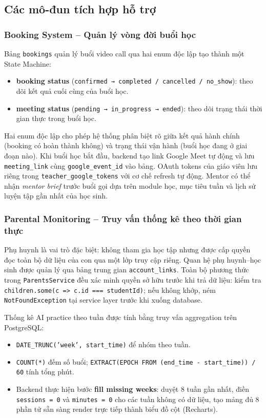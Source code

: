 \subsection{Các mô-đun tích hợp hỗ trợ}

\subsubsection{Booking System -- Quản lý vòng đời buổi học}

Bảng \texttt{bookings} quản lý buổi video call qua hai enum độc lập tạo thành một State Machine:

\begin{itemize}
    \item \textbf{booking status} (\texttt{confirmed → completed / cancelled / no\_show}): theo dõi kết quả cuối cùng của buổi học.
    \item \textbf{meeting status} (\texttt{pending → in\_progress → ended}): theo dõi trạng thái thời gian thực trong buổi học.
\end{itemize}

Hai enum độc lập cho phép hệ thống phân biệt rõ giữa kết quả hành chính (booking có hoàn thành không) và trạng thái vận hành (buổi học đang ở giai đoạn nào). Khi buổi học bắt đầu, backend tạo link Google Meet tự động và lưu \texttt{meeting\_link} cùng \texttt{google\_event\_id} vào bảng. OAuth tokens của giáo viên lưu riêng trong \texttt{teacher\_google\_tokens} với cơ chế refresh tự động. Mentor có thể nhận \textit{mentor brief} trước buổi gọi dựa trên module học, mục tiêu tuần và lịch sử luyện tập gần nhất của học sinh.

\subsubsection{Parental Monitoring -- Truy vấn thống kê theo thời gian thực}

Phụ huynh là vai trò đặc biệt: không tham gia học tập nhưng được cấp quyền đọc toàn bộ dữ liệu của con qua một lớp truy cập riêng. Quan hệ phụ huynh--học sinh được quản lý qua bảng trung gian \texttt{account\_links}. Toàn bộ phương thức trong \texttt{ParentsService} đều xác minh quyền sở hữu trước khi trả dữ liệu: kiểm tra \texttt{children.some(c => c.id === studentId)}; nếu không khớp, ném \texttt{NotFoundException} tại service layer trước khi xuống database.

Thống kê AI practice theo tuần được tính bằng truy vấn aggregation trên PostgreSQL:
\begin{itemize}
    \item \texttt{DATE\_TRUNC('week', start\_time)} để nhóm theo tuần.
    \item \texttt{COUNT(*)} đếm số buổi; \texttt{EXTRACT(EPOCH FROM (end\_time - start\_time)) / 60} tính tổng phút.
    \item Backend thực hiện bước \textbf{fill missing weeks}: duyệt 8 tuần gần nhất, điền \texttt{sessions = 0} và \texttt{minutes = 0} cho các tuần không có dữ liệu, tạo mảng đủ 8 phần tử sẵn sàng render trực tiếp thành biểu đồ cột (Recharts).
\end{itemize}

